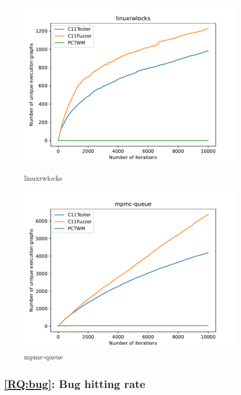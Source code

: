 \begin{figure}[H]
	\begin{minipage}{0.45\textwidth}
		\centering
		\includegraphics[width=\textwidth]{figure/pctwm/linuxrwlocks.pdf}
		\caption{linuxrwlocks}
		\label{pctwm-linuxrwlocks}
	\end{minipage}
	\hfill
	\begin{minipage}{0.45\textwidth}
		\centering
		\includegraphics[width=\textwidth]{figure/pctwm/mpmc-queue.pdf}
		\caption{mpmc-queue}
		\label{pctwm-mpmc-queue}
	\end{minipage}
	\vspace{0.5cm}

\end{figure}


\subsection{\ref*{RQ:bug}: Bug hitting rate}

